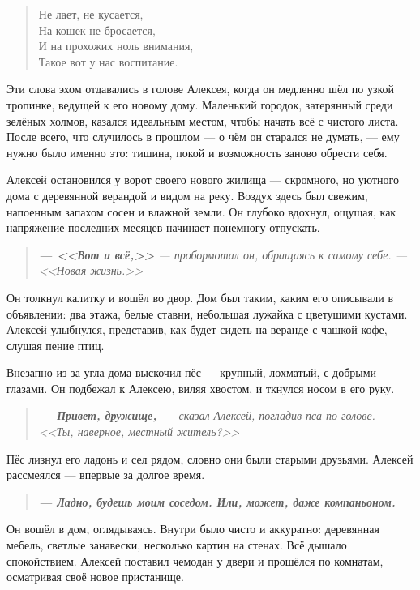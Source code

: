 \documentclass[12pt,a4paper]{book}
\newenvironment{dialogue}{\begin{quote}\itshape}{\end{quote}} %
\begin{document}
\begin{verse}
Не лает, не кусается,\\
На кошек не бросается,\\
И на прохожих ноль внимания,\\
Такое вот у нас воспитание.
\end{verse}

Эти слова эхом отдавались в голове Алексея, когда он медленно шёл по узкой тропинке, ведущей к его новому дому. Маленький городок, затерянный среди зелёных холмов, казался идеальным местом, чтобы начать всё с чистого листа. После всего, что случилось в прошлом --- о чём он старался не думать, --- ему нужно было именно это: тишина, покой и возможность заново обрести себя.

Алексей остановился у ворот своего нового жилища --- скромного, но уютного дома с деревянной верандой и видом на реку. Воздух здесь был свежим, напоенным запахом сосен и влажной земли. Он глубоко вдохнул, ощущая, как напряжение последних месяцев начинает понемногу отпускать.

\begin{dialogue}
\textbf{--- <<Вот и всё,>>} --- пробормотал он, обращаясь к самому себе. --- <<Новая жизнь.>>
\end{dialogue}

Он толкнул калитку и вошёл во двор. Дом был таким, каким его описывали в объявлении: два этажа, белые ставни, небольшая лужайка с цветущими кустами. Алексей улыбнулся, представив, как будет сидеть на веранде с чашкой кофе, слушая пение птиц.

Внезапно из-за угла дома выскочил пёс --- крупный, лохматый, с добрыми глазами. Он подбежал к Алексею, виляя хвостом, и ткнулся носом в его руку.

\begin{dialogue}
\textbf{--- Привет, дружище, ---} сказал Алексей, погладив пса по голове. --- <<Ты, наверное, местный житель?>>
\end{dialogue}

Пёс лизнул его ладонь и сел рядом, словно они были старыми друзьями. Алексей рассмеялся --- впервые за долгое время.

\begin{dialogue}
\textbf{--- Ладно, будешь моим соседом. Или, может, даже компаньоном.}
\end{dialogue}

Он вошёл в дом, оглядываясь. Внутри было чисто и аккуратно: деревянная мебель, светлые занавески, несколько картин на стенах. Всё дышало спокойствием. Алексей поставил чемодан у двери и прошёлся по комнатам, осматривая своё новое пристанище.
\end{document}
